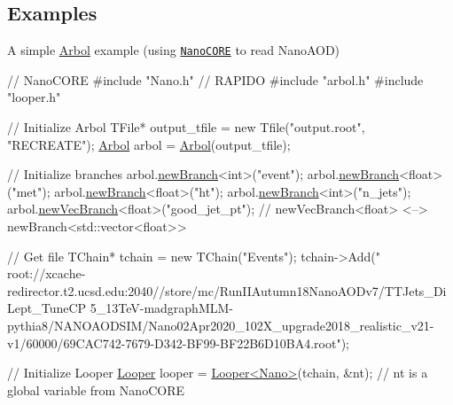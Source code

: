 \subsection*{Examples}


\begin{DoxyEnumerate}
\item A simple \hyperlink{classArbol}{Arbol} example (using \href{https://github.com/cmstas/NanoTools}{\tt Nano\+C\+O\+RE} to read Nano\+A\+OD) 
\begin{DoxyCode}
\textcolor{comment}{// NanoCORE}
\textcolor{preprocessor}{#include "Nano.h"}
\textcolor{comment}{// RAPIDO}
\textcolor{preprocessor}{#include "arbol.h"}
\textcolor{preprocessor}{#include "looper.h"}

\textcolor{comment}{// Initialize Arbol}
TFile* output\_tfile = \textcolor{keyword}{new} Tfile(\textcolor{stringliteral}{"output.root"}, \textcolor{stringliteral}{"RECREATE"});
\hyperlink{classArbol}{Arbol} arbol = \hyperlink{classArbol}{Arbol}(output\_tfile);

\textcolor{comment}{// Initialize branches}
arbol.\hyperlink{classArbol_a552622885ffce15f1b1369fe44e729bb}{newBranch}<\textcolor{keywordtype}{int}>(\textcolor{stringliteral}{"event"});
arbol.\hyperlink{classArbol_a552622885ffce15f1b1369fe44e729bb}{newBranch}<\textcolor{keywordtype}{float}>(\textcolor{stringliteral}{"met"});
arbol.\hyperlink{classArbol_a552622885ffce15f1b1369fe44e729bb}{newBranch}<\textcolor{keywordtype}{float}>(\textcolor{stringliteral}{"ht"});
arbol.\hyperlink{classArbol_a552622885ffce15f1b1369fe44e729bb}{newBranch}<\textcolor{keywordtype}{int}>(\textcolor{stringliteral}{"n\_jets"});
arbol.\hyperlink{classArbol_a57b6cf7cca6cbb3b75bb0e0333dbe3c8}{newVecBranch}<\textcolor{keywordtype}{float}>(\textcolor{stringliteral}{"good\_jet\_pt"}); \textcolor{comment}{// newVecBranch<float> <-->
       newBranch<std::vector<float>>}

\textcolor{comment}{// Get file}
TChain* tchain = \textcolor{keyword}{new} TChain(\textcolor{stringliteral}{"Events"}); 
tchain->Add(\textcolor{stringliteral}{"
      root://xcache-redirector.t2.ucsd.edu:2040//store/mc/RunIIAutumn18NanoAODv7/TTJets\_DiLept\_TuneCP
      5\_13TeV-madgraphMLM-pythia8/NANOAODSIM/Nano02Apr2020\_102X\_upgrade2018\_realistic\_v21-v1/60000/69CAC742-7679-D342-BF99-BF22B6D10BA4.root"});

\textcolor{comment}{// Initialize Looper}
\hyperlink{classLooper}{Looper} looper = \hyperlink{classLooper}{Looper<Nano>}(tchain, &nt); \textcolor{comment}{// nt is a global variable from NanoCORE}


\end{DoxyCode}
\end{DoxyEnumerate}
